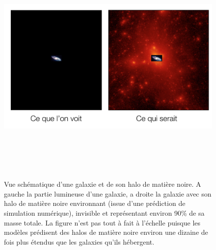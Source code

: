 \begin{figure}[htbp]
	\centering
		\includegraphics[height=12cm]{figs/halogal.png}
	\caption[Une galaxie et son halo de matière noire]{Vue schématique d'une galaxie et de son halo de matière noire. A gauche la partie lumineuse d'une galaxie, a droite la galaxie avec son halo de matière noire environnant (issue d'une prédiction de simulation numérique), invisible et représentant environ 90\% de sa masse totale. La figure n'est pas tout à fait à l'échelle puisque les modèles prédisent des halos de matière noire environ une dizaine de fois plus étendus que les galaxies qu'ils hébergent.} 
	\label{f:halogal}
\end{figure}


